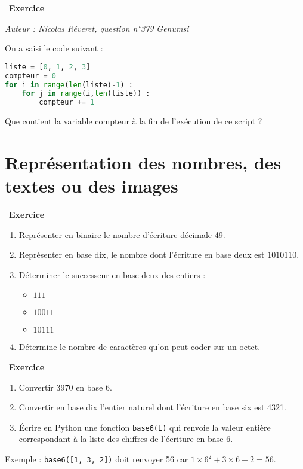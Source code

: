 \documentclass[
  11pt,
]{article}
\newcommand{\passthrough}[1]{#1}
\providecommand{\tightlist}{%
  \setlength{\itemsep}{0pt}\setlength{\parskip}{0pt}}
\newcounter{exo}
\newenvironment{exercice}[1]
{\par \medskip   \addtocounter{exo}{1} \noindent  
\begin{bclogo}[arrondi =0.1,   noborder = true, logo=\bccrayon, marge=4]{~\textbf{Exercice} \textbf{\theexo} {\itshape #1} }  \par}
{
\end{bclogo}
 \par \bigskip }
\newcounter{def}
\begin{document}
\begin{exercice}{}

\emph{Auteur : Nicolas Réveret, question n°379 Genumsi}

On a saisi le code suivant :

\begin{lstlisting}[language=Python]
liste = [0, 1, 2, 3]
compteur = 0
for i in range(len(liste)-1) :
    for j in range(i,len(liste)) :
        compteur += 1
\end{lstlisting}

Que contient la variable compteur à la fin de l'exécution de ce script ?

\end{exercice}

\hypertarget{repruxe9sentation-des-nombres-des-textes-ou-des-images}{%
\section{Représentation des nombres, des textes ou des
images}\label{repruxe9sentation-des-nombres-des-textes-ou-des-images}}

\begin{exercice}{}

\begin{enumerate}
\def\labelenumi{\arabic{enumi}.}
\tightlist
\item
  Représenter en binaire le nombre d'écriture décimale 49.
\item
  Représenter en base dix, le nombre dont l'écriture en base deux est
  \(1010110\).
\item
  Déterminer le successeur en base deux des entiers :

  \begin{itemize}
  \tightlist
  \item
    \(111\)
  \item
    \(10011\)
  \item
    \(10111\)
  \end{itemize}
\item
  Détermine le nombre de caractères qu'on peut coder sur un octet.
\end{enumerate}

\end{exercice}

\begin{exercice}{}

\begin{enumerate}
\def\labelenumi{\arabic{enumi}.}
\tightlist
\item
  Convertir 3970 en base 6.
\item
  Convertir en base dix l'entier naturel dont l'écriture en base six est
  4321.
\item
  Écrire en Python une fonction \passthrough{\lstinline!base6(L)!} qui
  renvoie la valeur entière correspondant à la liste des chiffres de
  l'écriture en base 6.
\end{enumerate}

Exemple : \passthrough{\lstinline!base6([1, 3, 2])!} doit renvoyer 56
car \(1 \times 6^{2} + 3 \times 6 + 2 = 56\).

\end{exercice}
\end{document}
